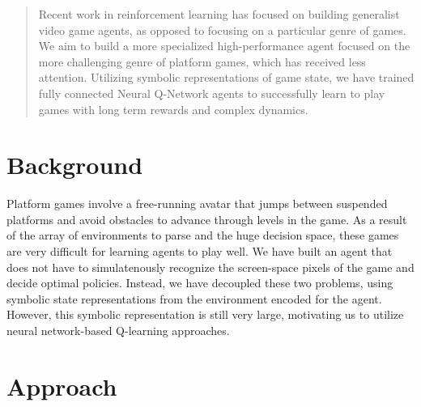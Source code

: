 \documentclass{article}
\begin{document}
 


\begin{abstract} 
Recent work in reinforcement learning has focused on building generalist video game agents, as opposed to focusing on a particular genre of games. We aim to build a more specialized high-performance agent focused on the more challenging genre of platform games, which has received less attention. Utilizing symbolic representations of game state, we have trained fully connected Neural Q-Network agents to successfully learn to play games with long term rewards and complex dynamics.
\end{abstract} 



\section{Background}
Platform games involve a free-running avatar that jumps between suspended platforms and avoid obstacles to advance through levels in the game. As a result of the array of environments to parse and the huge decision space, these games are very difficult for learning agents to play well. We have built an agent that does not have to simulatenously recognize the screen-space pixels of the game and decide optimal policies. Instead, we have decoupled these two problems, using symbolic state representations from the environment encoded for the agent. However, this symbolic representation is still very large, motivating us to utilize neural network-based Q-learning approaches. 

\section{Approach}
\end{document}
